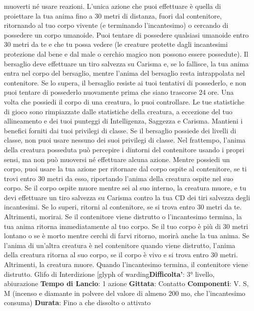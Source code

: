 \begin{multicols}{2}
muoverti né usare reazioni. L’unica azione che puoi
effettuare è quella di proiettare la tua anima fino a 30
metri di distanza, fuori dal contenitore, ritornando al tuo
corpo vivente (e terminando l’incantesimo) o cercando
di possedere un corpo umanoide.
Puoi tentare di possedere qualsiasi umanoide entro 30
metri da te e che tu possa vedere (le creature protette
dagli incantesimi protezione dal bene e dal male o
cerchio magico non possono essere possedute). Il
bersaglio deve effettuare un tiro salvezza su Carisma e,
se lo fallisce, la tua anima entra nel corpo del bersaglio,
mentre l’anima del bersaglio resta intrappolata nel
contenitore. Se lo supera, il bersaglio resiste ai tuoi
tentativi di possederlo, e non puoi tentare di possederlo
nuovamente prima che siano trascorse 24 ore.
Una volta che possiedi il corpo di una creatura, lo puoi
controllare. Le tue statistiche di gioco sono rimpiazzate
dalle statistiche della creatura, a eccezione del tuo
allineamento e dei tuoi punteggi di Intelligenza,
Saggezza e Carisma. Mantieni i benefici forniti dai tuoi
privilegi di classe. Se il bersaglio possiede dei livelli di
classe, non puoi usare nessuno dei suoi privilegi di
classe.
Nel frattempo, l’anima della creatura posseduta può
percepire i dintorni del contenitore usando i propri
sensi, ma non può muoversi né effettuare alcuna
azione.
Mentre possiedi un corpo, puoi usare la tua azione per
ritornare dal corpo ospite al contenitore, se ti trovi entro
30 metri da esso, riportando l’anima della creatura
ospite nel suo corpo. Se il corpo ospite muore mentre
sei al suo interno, la creatura muore, e tu devi effettuare
un tiro salvezza su Carisma contro la tua CD dei tiri
salvezza degli incantesimi. Se lo superi, ritorni al
contenitore, se si trova entro 30 metri da te. Altrimenti,
morirai.
Se il contenitore viene distrutto o l’incantesimo termina,
la tua anima ritorna immediatamente al tuo corpo. Se il
tuo corpo è più di 30 metri lontano o se è morto mentre
cerchi di farvi ritorno, morirà anche la tua anima. Se
l’anima di un’altra creatura è nel contenitore quando
viene distrutto, l’anima della creatura ritorna al suo
corpo, se il corpo è vivo e si trova entro 30 metri.
Altrimenti, la creatura muore.
Quando l’incantesimo termina, il contenitore viene
distrutto.
Glifo di Interdizione
[glyph of warding\textbf{Difficolta'}:
3° livello, abiurazione
\textbf{Tempo di Lancio}: 1 azione
\textbf{Gittata}: Contatto
\textbf{Componenti}: V. S, M (incenso e diamante in polvere
del valore di almeno 200 mo, che l’incantesimo
consuma)
\textbf{Durata}: Fino a che dissolto o attivato

\end{multicols}
